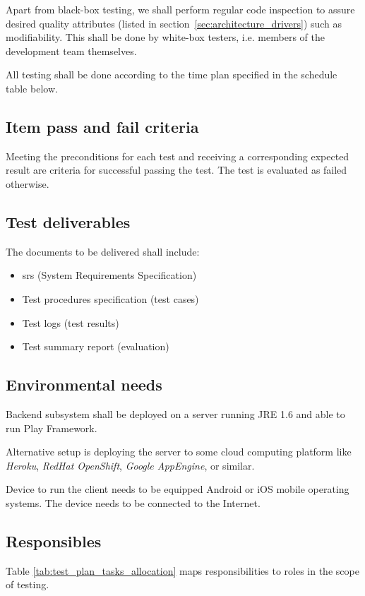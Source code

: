 \documentclass[11pt]{book}
\begin{document}
Apart from black-box testing, we shall perform regular code inspection to assure desired quality attributes (listed in section~\ref{sec:architecture_drivers}) such as modifiability. This shall be done by white-box testers, i.e. members of the development team themselves.

All testing shall be done according to the time plan specified in the schedule table below.

\subsection{Item pass and fail criteria}
Meeting the preconditions for each test and receiving a corresponding expected result are criteria for successful passing the test. The test is evaluated as failed otherwise.

\subsection{Test deliverables}
The documents to be delivered shall include:

\begin{itemize}
    \item \gls{srs} (System Requirements Specification)
    \item Test procedures specification (test cases)
    \item Test logs (test results)
    \item Test summary report (evaluation)
\end{itemize}

\subsection{Environmental needs}
Backend subsystem shall be deployed on a server running JRE 1.6 and able to run Play Framework.

Alternative setup is deploying the server to some cloud computing platform like \emph{Heroku}, \emph{RedHat OpenShift}, \emph{Google AppEngine}, or similar. 

Device to run the client needs to be equipped Android or iOS mobile operating systems. The device needs to be connected to the Internet.

\subsection{Responsibles}

Table \ref{tab:test_plan_tasks_allocation} maps responsibilities to roles in the scope of testing.
\end{document}
